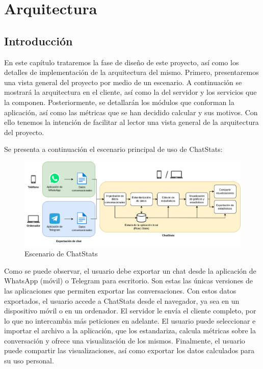 \chapter{Arquitectura}
\label{chap:architecture}


\section{Introducción}
\label{sec:introduction}

En este capítulo trataremos la fase de diseño de este proyecto, así como los detalles de implementación de la arquitectura del mismo. Primero, presentaremos una vista general del proyecto por medio de un escenario. A continuación se mostrará la arquitectura en el cliente, así como la del servidor y los servicios que la componen. Posteriormente, se detallarán los módulos que conforman la aplicación, así como las métricas que se han decidido calcular y sus motivos. Con ello tenemos la intención de facilitar al lector una vista general de la arquitectura del proyecto.

Se presenta a continuación el escenario principal de uso de ChatStats:

\begin{figure}[H]
	\centering
	\includegraphics[width=\textwidth]{img/scenario.png}
	\caption{Escenario de ChatStats}
	\label{fig:chap4:architecture_scenario}
\end{figure}


Como se puede observar, el usuario debe exportar un chat desde la aplicación de WhatsApp (móvil) o Telegram para escritorio. Son estas las únicas versiones de las aplicaciones que permiten exportar las conversaciones. Con estos datos exportados, el usuario accede a ChatStats desde el navegador, ya sea en un dispositivo móvil o en un ordenador. El servidor le envía el cliente completo, por lo que no intercambia más peticiones en adelante. El usuario puede seleccionar e importar el archivo a la aplicación, que los estandariza, calcula métricas sobre la conversación y ofrece una visualización de los mismos. Finalmente, el usuario puede compartir las visualizaciones, así como exportar los datos calculados para su uso personal.


